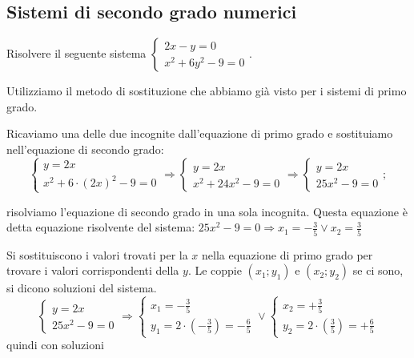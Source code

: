 \subsection{Sistemi di secondo grado numerici}
\begin{exrig}
\begin{esempio}
Risolvere il seguente sistema $\left\{\begin{array}{l}{2x-y=0}\\{x^2+6y^2-9=0}\end{array}\right..$

Utilizziamo il metodo di sostituzione che abbiamo già visto per i sistemi di primo grado.
\begin{itemize*}
\item Ricaviamo una delle due incognite dall'equazione di primo grado e sostituiamo nell'equazione di secondo grado:
\[\left\{\begin{array}{l}y=2x \\
x^2+6\cdot (2x)^2-9=0\end{array}\right. 
\Rightarrow\left\{\begin{array}{l}y=2x \\
x^2+24x^2-9=0\end{array}\right. 
\Rightarrow \left\{\begin{array}{l}y=2x \\
25x^2-9=0\end{array}\right.;\]
\item risolviamo l'equazione di secondo grado in una sola incognita. Questa equazione è detta equazione risolvente del sistema:
 $25x^2-9=0\Rightarrow x_1=-\frac 3 5\vee x_2=\frac 3 5$
\item Si sostituiscono i valori trovati per la $ x $ nella equazione di primo grado per trovare i valori corrispondenti della $ y $. Le coppie $(x_1;y_1)$ e $(x_2;y_2)$ se ci sono, si dicono soluzioni del sistema.
\[\left\{\begin{array}{l}{y=2x}\\
{25x^2-9=0}\end{array}\right. 
\Rightarrow \left\{\begin{array}{l}x_1=-\frac 3 5 \\
y_1=2\cdot \left(-\frac 3 5\right)=-\frac 6 5\end{array}\right.\vee 
\left\{\begin{array}{l}x_2=+\frac 3 5 \\
y_2=2\cdot \left(\frac 3 5\right)=+\frac 6 5 \end{array}\right.\] 
quindi con soluzioni 

\end{itemize*}
\end{esempio}
\end{exrig}
